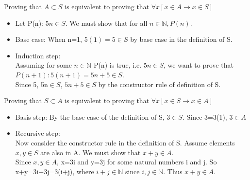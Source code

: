 \documentclass[solution, letterpaper]{cs20}
\begin{document}
\begin{solution}
\subsolution Proving that $A\subset S$ is equivalent to proving that $\forall x[x\in A\rightarrow x\in S]$
\begin{itemize}
\item Let P(n): $5n\in S$. We must show that for all $n\in\mathbb{N}, P(n)$.
\item Base case: When n=1, $5(1)=5\in S$ by base case in the definition of S.
\item Induction step: \\
Assuming for some $n\in\mathbb{N}$ P(n) is true, i.e. $5n\in S$, we want to prove that $P(n+1): 5(n+1)=5n+5\in S$.\\
Since 5, 5n$\in S$, $5n+5\in S$ by the constructor rule of definition of S.
\end{itemize}
\subsolution Proving that $S\subset A$ is equivalent to proving that $\forall x[x\in S\rightarrow x\in A]$
\begin{itemize}
\item Basis step: By the base case of the definition of S, $3\in S$. Since 3=3(1), $3\in A$
\item Recursive step: \\
Now consider the constructor rule in the definition of S. Assume elements $x,y\in S$ are also in A. We must  show that $x+y\in A$.\\
Since $x,y\in A$, x=3i and y=3j for some natural numbers i and j. So x+y=3i+3j=3(i+j), where $i+j\in\mathbb{N}$ since $i,j\in\mathbb{N}$. Thus $x+y\in A.$
\end{itemize}
\end{solution}
\end{document}
